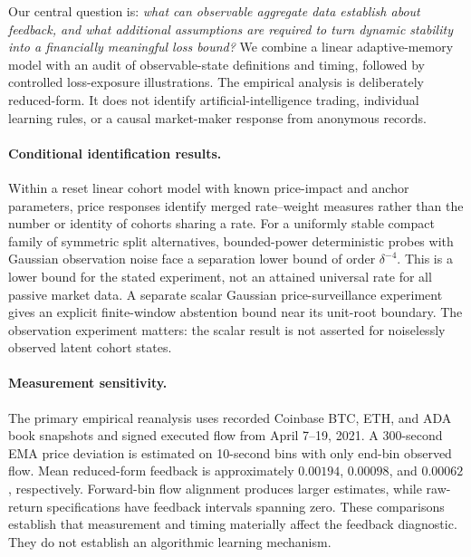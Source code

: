 \documentclass[12pt]{article}
\theoremstyle{definition}
\theoremstyle{remark}
\begin{document}
Our central question is: \emph{what can observable aggregate data establish about feedback, and what additional assumptions are required to turn dynamic stability into a financially meaningful loss bound?} We combine a linear adaptive-memory model with an audit of observable-state definitions and timing, followed by controlled loss-exposure illustrations. The empirical analysis is deliberately reduced-form. It does not identify artificial-intelligence trading, individual learning rules, or a causal market-maker response from anonymous records.

\paragraph{Conditional identification results.}
Within a reset linear cohort model with known price-impact and anchor parameters, price responses identify merged rate--weight measures rather than the number or identity of cohorts sharing a rate. For a uniformly stable compact family of symmetric split alternatives, bounded-power deterministic probes with Gaussian observation noise face a separation lower bound of order $\delta^{-4}$. This is a lower bound for the stated experiment, not an attained universal rate for all passive market data. A separate scalar Gaussian price-surveillance experiment gives an explicit finite-window abstention bound near its unit-root boundary. The observation experiment matters: the scalar result is not asserted for noiselessly observed latent cohort states.

\paragraph{Measurement sensitivity.}
The primary empirical reanalysis uses recorded Coinbase BTC, ETH, and ADA book snapshots and signed executed flow from April 7--19, 2021. A 300-second EMA price deviation is estimated on 10-second bins with only end-bin observed flow. Mean reduced-form feedback is approximately $0.00194$, $0.00098$, and $0.00062$, respectively. Forward-bin flow alignment produces larger estimates, while raw-return specifications have feedback intervals spanning zero. These comparisons establish that measurement and timing materially affect the feedback diagnostic. They do not establish an algorithmic learning mechanism.
\end{document}
